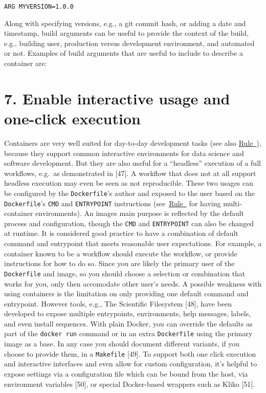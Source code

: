 \documentclass[10pt,letterpaper]{article}
\begin{document}
\begin{verbatim}
ARG MYVERSION=1.0.0
\end{verbatim}

Along with specifying versions, e.g., a git commit hash, or adding a
date and timestamp, build arguments can be useful to provide the context
of the build, e.g., building user, production versus development
environment, and automated or not. Examples of build arguments that are
useful to include to describe a container are:

\hypertarget{enable-interactive-usage-and-one-click-execution}{%
\section*{7. Enable interactive usage and one-click
execution}\label{enable-interactive-usage-and-one-click-execution}}

  \label{rule:interactive} 

Containers are very well suited for day-to-day development tasks (see
also \hyperref[{rule:usage}]{Rule~}), because they
support common interactive environments for data science and software
development. But they are also useful for a ``headless'' execution of a
full workflows, e.g.~as demonstrated in {[}47{]}. A workflow that does
not at all support headless execution may even be seen as not
reproducible. These two usages can be configured by the
\texttt{Dockerfile}'s author and exposed to the user based on the
\texttt{Dockerfile}'s \texttt{CMD} and \texttt{ENTRYPOINT} instructions
(see~\hyperref[{rule:templates}]{Rule~} for
having multi-container environments). An images main purpose is
reflected by the default process and configuration, though the
\texttt{CMD} and \texttt{ENTRYPOINT} can also be changed at runtime. It
is considered good practice to have a combination of default command and
entrypoint that meets reasonable user expectations. For example, a
container known to be a workflow should execute the workflow, or provide
instructions for how to do so. Since you are likely the primary user of
the \texttt{Dockerfile} and image, so you should choose a selection or
combination that works for you, only then accomodate other user's needs.
A possible weakness with using containers is the limitation on only
providing one default command and entrypoint. However tools, e.g., The
Scientific Filesystem {[}48{]}, have been developed to expose multiple
entrypoints, environments, help messages, labels, and even install
sequences. With plain Docker, you can override the defaults as part of
the \texttt{docker\ run} command or in an extra \texttt{Dockerfile}
using the primary image as a base. In any case you should document
different variants, if you choose to provide them, in a
\texttt{Makefile} {[}49{]}. To support both one click execution and
interactive interfaces and even allow for custom configuration, it's
helpful to expose settings via a configuration file which can be bound
from the host, via environment variables {[}50{]}, or special
Docker-based wrappers such as Kliko {[}51{]}.
\end{document}
